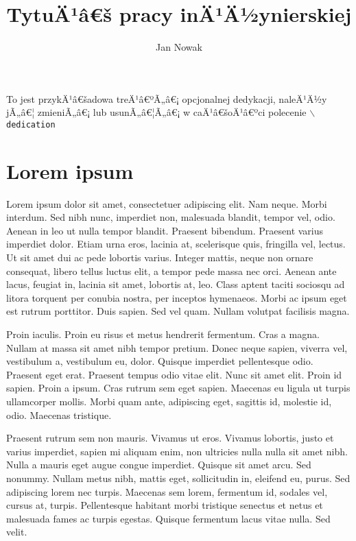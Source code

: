 \documentclass[eng,printmode]{mgr}
\title{TytuÄ¹â€š pracy inÄ¹Ä½ynierskiej}
\author{Jan Nowak}
\begin{document}

\maketitle %
\dedication{6cm}{To jest przykÄ¹â€šadowa treÄ¹â€ºÃ„â€¡ opcjonalnej dedykacji, naleÄ¹Ä½y jÃ„â€¦ zmieniÃ„â€¡ lub usunÃ„â€¦Ã„â€¡ w caÄ¹â€šoÄ¹â€ºci polecenie \texttt{$\backslash$dedication}}

\tableofcontents %

\chapter{Lorem ipsum}
Lorem ipsum dolor sit amet, consectetuer adipiscing elit. Nam neque. Morbi interdum. Sed nibh nunc, imperdiet non, malesuada blandit, tempor vel, odio. Aenean in leo ut nulla tempor blandit. Praesent bibendum. Praesent varius imperdiet dolor. Etiam urna eros, lacinia at, scelerisque quis, fringilla vel, lectus. Ut sit amet dui ac pede lobortis varius. Integer mattis, neque non ornare consequat, libero tellus luctus elit, a tempor pede massa nec orci. Aenean ante lacus, feugiat in, lacinia sit amet, lobortis at, leo. Class aptent taciti sociosqu ad litora torquent per conubia nostra, per inceptos hymenaeos. Morbi ac ipsum eget est rutrum porttitor. Duis sapien. Sed vel quam. Nullam volutpat facilisis magna. 

Proin iaculis. Proin eu risus et metus hendrerit fermentum. Cras a magna. Nullam at massa sit amet nibh tempor pretium. Donec neque sapien, viverra vel, vestibulum a, vestibulum eu, dolor. Quisque imperdiet pellentesque odio. Praesent eget erat. Praesent tempus odio vitae elit. Nunc sit amet elit. Proin id sapien. Proin a ipsum. Cras rutrum sem eget sapien. Maecenas eu ligula ut turpis ullamcorper mollis. Morbi quam ante, adipiscing eget, sagittis id, molestie id, odio. Maecenas tristique. 

Praesent rutrum sem non mauris. Vivamus ut eros. Vivamus lobortis, justo et varius imperdiet, sapien mi aliquam enim, non ultricies nulla nulla sit amet nibh. Nulla a mauris eget augue congue imperdiet. Quisque sit amet arcu. Sed nonummy. Nullam metus nibh, mattis eget, sollicitudin in, eleifend eu, purus. Sed adipiscing lorem nec turpis. Maecenas sem lorem, fermentum id, sodales vel, cursus at, turpis. Pellentesque habitant morbi tristique senectus et netus et malesuada fames ac turpis egestas. Quisque fermentum lacus vitae nulla. Sed velit. 
\end{document}
